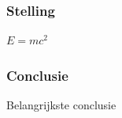 \documentclass{uva-inf-presentation}
\begin{document}
\section{}
\begin{frame}
\frametitle{Stelling}
\begin{theorem}
$E = mc^2$
\end{theorem}
\end{frame}
\begin{frame}
\frametitle{Conclusie}
\Large{\centerline{Belangrijkste conclusie}}
\end{frame}
\end{document}

